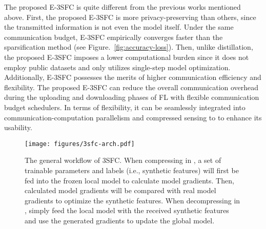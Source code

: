 The proposed E-3SFC is quite different from the previous works mentioned above.
First, the proposed E-3SFC is more privacy-preserving than others, since the transmitted information is not even the model itself.
Under the same communication budget, E-3SFC empirically converges faster than the sparsification method (see Figure.~\ref{fig:accuracy-loss}).
Then, unlike distillation, the proposed E-3SFC imposes a lower computational burden since it does not employ public datasets and only utilizes single-step model optimization.
Additionally, E-3SFC possesses the merits of higher communication efficiency and flexibility.
The proposed E-3SFC can reduce the overall communication overhead during the uploading and downloading phases of FL with flexible communication budget schedulers.
In terms of flexibility, it can be seamlessly integrated into communication-computation parallelism and compressed sensing to to enhance its usability.


\begin{figure*}[!h]
    \centering
    \texttt{[image: figures/3sfc-arch.pdf]}
    \caption{The general workflow of 3SFC. When compressing in , a set of trainable parameters and labels (i.e., synthetic features) will first be fed into the frozen local model to calculate model gradients. Then, calculated model gradients will be compared with real model gradients to optimize the synthetic features. When decompressing in , simply feed the local model with the received synthetic features and use the generated gradients to update the global model.}
    \label{fig:3sfc-arch}
\end{figure*}